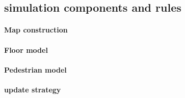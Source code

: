 \documentclass[paper=a4, fontsize=11pt]{article} %
\begin{document}
\subsection{simulation components and rules}

\paragraph{Map construction}

\paragraph{Floor model}

\paragraph{Pedestrian model}

\paragraph{update strategy}

\end{document}
